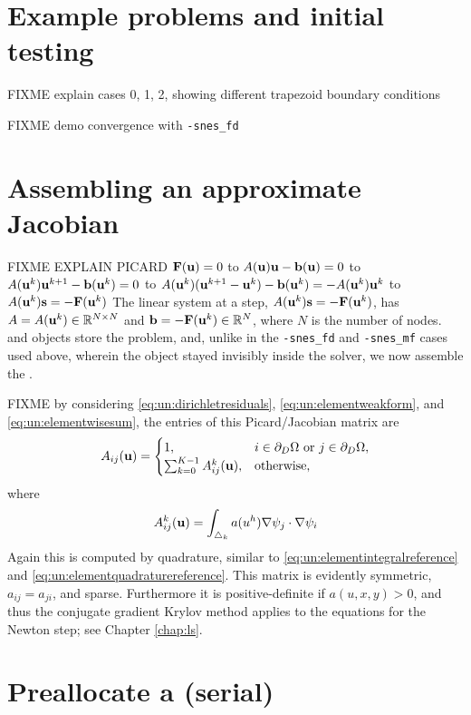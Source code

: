 \section{Example problems and initial testing}

FIXME explain cases 0, 1, 2, showing different trapezoid boundary conditions

FIXME demo convergence with \texttt{-snes\_fd}

\section{Assembling an approximate Jacobian}

FIXME EXPLAIN PICARD $\mathbf{F}(\mathbf{u})=0$ to $A(\mathbf{u}) \mathbf{u} - \mathbf{b}(\mathbf{u})=0$ to $A(\mathbf{u}^k) \mathbf{u}^{k+1} - \mathbf{b}(\mathbf{u}^k)=0$ to $A(\mathbf{u}^k) (\mathbf{u}^{k+1}-\mathbf{u}^k) - \mathbf{b}(\mathbf{u}^k)= - A(\mathbf{u}^k) \mathbf{u}^k$ to $A(\mathbf{u}^k) \mathbf{s} = -\mathbf{F}(\mathbf{u}^k)$  The linear system at a step, $A(\mathbf{u}^k) \mathbf{s} = -\mathbf{F}(\mathbf{u}^k)$, has $A=A(\mathbf{u}^k)\in\mathbb{R}^{N\times N}$ and $\mathbf{b}=-\mathbf{F}(\mathbf{u}^k)\in\mathbb{R}^N$, where $N$ is the number of nodes.  \pMat and \pVec objects store the problem, and, unlike in the \texttt{-snes\_fd} and \texttt{-snes\_mf} cases used above, wherein the \pMat object stayed invisibly inside the \pSNES solver, we now assemble the \pMat.

FIXME by considering \eqref{eq:un:dirichletresiduals}, \eqref{eq:un:elementweakform}, and \eqref{eq:un:elementwisesum}, the entries of this Picard/Jacobian matrix are
\begin{equation}
A_{ij}(\mathbf{u}) =  \begin{cases}
               1, & i \in \partial_D\Omega \text{ or } j \in \partial_D\Omega, \\
               \sum_{k=0}^{K-1} A_{ij}^k(\mathbf{u}), & \text{otherwise},
               \end{cases} \label{eq:un:picardentry}
\end{equation}
where
\begin{equation}
A_{ij}^k(\mathbf{u}) = \int_{\triangle_k} a(u^h) \nabla\psi_j \cdot \nabla\psi_i \label{eq:un:picardentryelement}
\end{equation}
Again this is computed by quadrature, similar to \eqref{eq:un:elementintegralreference} and \eqref{eq:un:elementquadraturereference}.  This matrix is evidently symmetric, $a_{ij}=a_{ji}$, and sparse.  Furthermore it is positive-definite if $a(u,x,y)>0$, and thus the conjugate gradient Krylov method applies to the equations for the Newton step; see Chapter \ref{chap:ls}.

\section{Preallocate a \pMat (serial)}

